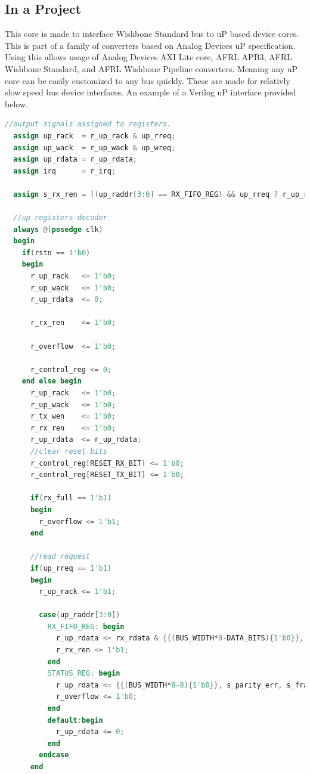

\subsection{In a Project}
\par
This core is made to interface Wishbone Standard bus to uP based device cores. This is part of a family of converters based on Analog Devices uP specification. Using this allows usage of Analog Devices AXI Lite core, AFRL APB3, AFRL Wishbone Standard, and AFRL Wishbone Pipeline converters. Meaning any uP core can be easily customized to any bus quickly. These are made for relativly slow speed bus device interfaces. An example of a Verilog uP interface provided below.

\begin{lstlisting}[language=Verilog]
  //output signals assigned to registers.
  assign up_rack  = r_up_rack & up_rreq;
  assign up_wack  = r_up_wack & up_wreq;
  assign up_rdata = r_up_rdata;
  assign irq      = r_irq;

  assign s_rx_ren = ((up_raddr[3:0] == RX_FIFO_REG) && up_rreq ? r_up_rack & r_rx_ren : 0);

  //up registers decoder
  always @(posedge clk)
  begin
    if(rstn == 1'b0)
    begin
      r_up_rack   <= 1'b0;
      r_up_wack   <= 1'b0;
      r_up_rdata  <= 0;

      r_rx_ren    <= 1'b0;

      r_overflow  <= 1'b0;

      r_control_reg <= 0;
    end else begin
      r_up_rack   <= 1'b0;
      r_up_wack   <= 1'b0;
      r_tx_wen    <= 1'b0;
      r_rx_ren    <= 1'b0;
      r_up_rdata  <= r_up_rdata;
      //clear reset bits
      r_control_reg[RESET_RX_BIT] <= 1'b0;
      r_control_reg[RESET_TX_BIT] <= 1'b0;

      if(rx_full == 1'b1)
      begin
        r_overflow <= 1'b1;
      end

      //read request
      if(up_rreq == 1'b1)
      begin
        r_up_rack <= 1'b1;

        case(up_raddr[3:0])
          RX_FIFO_REG: begin
            r_up_rdata <= rx_rdata & {{(BUS_WIDTH*8-DATA_BITS){1'b0}}, {DATA_BITS{1'b1}}};
            r_rx_ren <= 1'b1;
          end
          STATUS_REG: begin
            r_up_rdata <= {{(BUS_WIDTH*8-8){1'b0}}, s_parity_err, s_frame_err, r_overflow, r_irq_en, tx_full, tx_empty, rx_full, rx_valid};
            r_overflow <= 1'b0;
          end
          default:begin
            r_up_rdata <= 0;
          end
        endcase
      end


\end{lstlisting}
